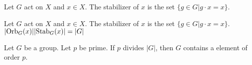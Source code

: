 \documentclass[../note.tex]{subfiles}
\begin{document}
\begin{definition}[Stabilizer]
	Let $G$ act on $X$ and $x \in X$. The stabilizer of $x$ is the set $\{g \in G | g\cdot x = x\}$.
\end{definition}

\begin{theorem}
	Let $G$ act on $X$ and $x \in X$. The stabilizer of $x$ is the set $\{g \in G | g\cdot x = x\}$.
	$|\text{Orb}_{G}({x})||\text{Stab}_{G}({x})|=|G|$
\end{theorem}

\begin{theorem}
	Let $G$ be a group. Let $p$ be prime. If $p$ divides $|G|$, then $G$ contains a element of order $p$.
\end{theorem}
\end{document}
